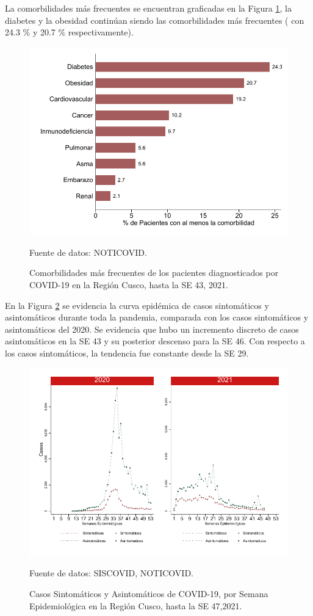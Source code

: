 \documentclass[12pt,a4paper,openany]{book}
\begin{document}
La comorbilidades más frecuentes se encuentran graficadas en la Figura \ref{fig:comorbilidades}, la diabetes y la obesidad continúan siendo las comorbilidades más frecuentes ( con 24.3 $\%$ y 20.7 $\%$ respectivamente). 
\begin{figure}[h]
	\caption{Comorbilidades más frecuentes de los pacientes diagnosticados por COVID-19 en la Región Cusco, hasta la SE 43, 2021. }\label{fig:comorbilidades}
	\begin{center}
		\includegraphics[width=0.65\linewidth]{../figuras/figura_comorbilidad.pdf}
	\end{center}
	{\footnotesize {Fuente de datos: NOTICOVID.}}
\end{figure}
\clearpage
 En la Figura \ref{fig:sintomaticos_asintomati} se evidencia la curva epidémica de casos sintomáticos y asintomáticos durante toda la pandemia, comparada con los casos sintomáticos y asintomáticos del 2020. Se evidencia que hubo un incremento discreto de casos asintomáticos en la SE 43 y su posterior descenso para la SE 46. Con respecto a los casos sintomáticos, la tendencia fue constante desde la SE 29.  
 
 
\begin{figure}[h]
	\caption{Casos Sintomáticos y Asintomáticos de COVID-19, por Semana Epidemiológica en la Región Cusco, hasta la SE 47,2021.  }\label{fig:sintomaticos_asintomati}
	
	\begin{center}
		\includegraphics[width=0.75\linewidth]{../figuras/sintomaticos_20_21.pdf}
	\end{center}
	{\footnotesize {Fuente de datos: SISCOVID, NOTICOVID.}}
\end{figure}
\clearpage
\end{document}
